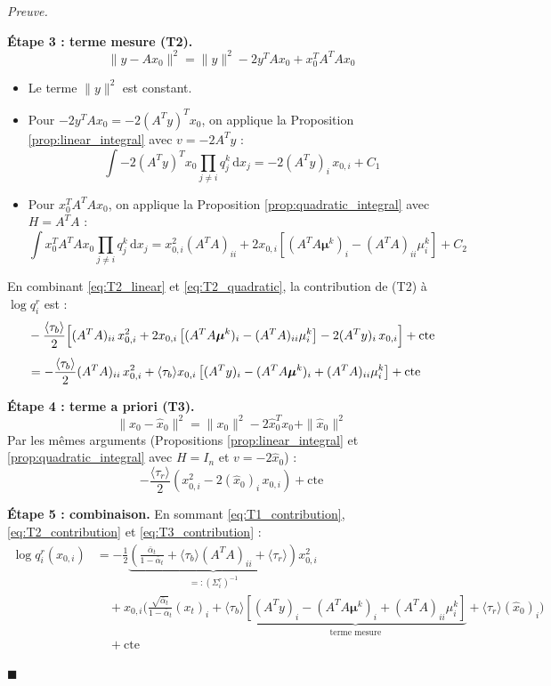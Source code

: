\documentclass[12pt]{article}
\newcommand{\alt}{\bar\alpha_t}
\renewcommand{\qedsymbol}{$\blacksquare$}
\renewenvironment{proof}[1][\proofname]{%
  \par\medskip\noindent
  \textit{\color{proofgray}#1.}\enspace\ignorespaces
}{\hfill\qedsymbol\par\medskip}
\renewcommand{\proofname}{Preuve}
\begin{document}
\begin{proof}
\textbf{Étape 3 : terme mesure (T2).}
\[
\|y - Ax_0\|^2 = \|y\|^2 - 2y^T A x_0 + x_0^T A^T A x_0
\]
\begin{itemize}
    \item Le terme $\|y\|^2$ est constant.
    \item Pour $-2y^T A x_0 = -2(A^T y)^T x_0$, on applique la Proposition \ref{prop:linear_integral} avec $v = -2A^T y$ :
    \begin{equation}
        \int -2(A^T y)^T x_0 \prod_{j \neq i} q_j^k\, \mathrm{d}x_j = -2(A^T y)_i\, x_{0,i} + C_1
        \label{eq:T2_linear}
    \end{equation}
    \item Pour $x_0^T A^T A x_0$, on applique la Proposition \ref{prop:quadratic_integral} avec $H = A^T A$ :
    \begin{equation}
        \int x_0^T A^T A x_0 \prod_{j \neq i} q_j^k\, \mathrm{d}x_j = x_{0,i}^2 (A^T A)_{ii} + 2x_{0,i}\left[(A^T A \boldsymbol{\mu}^k)_i - (A^T A)_{ii}\mu_i^k\right] + C_2
        \label{eq:T2_quadratic}
    \end{equation}
\end{itemize}

En combinant \eqref{eq:T2_linear} et \eqref{eq:T2_quadratic}, la contribution de (T2) à $\log q_i^r$ est :
\begin{align}
    &-\frac{\langle\tau_b\rangle}{2}\Bigl[(A^T A)_{ii}\, x_{0,i}^2 + 2x_{0,i}\left[(A^T A \boldsymbol{\mu}^k)_i - (A^T A)_{ii}\mu_i^k\right] - 2(A^T y)_i\, x_{0,i}\Bigr] + \mathrm{cte} \nonumber\\[4pt]
    &= -\frac{\langle\tau_b\rangle}{2}(A^T A)_{ii}\, x_{0,i}^2 + \langle\tau_b\rangle x_{0,i}\left[(A^T y)_i - (A^T A \boldsymbol{\mu}^k)_i + (A^T A)_{ii}\mu_i^k\right] + \mathrm{cte}
    \label{eq:T2_contribution}
\end{align}

\textbf{Étape 4 : terme a priori (T3).}
\[
\|x_0 - \hat{x}_0\|^2 = \|x_0\|^2 - 2\hat{x}_0^T x_0 + \|\hat{x}_0\|^2
\]
Par les mêmes arguments (Propositions \ref{prop:linear_integral} et \ref{prop:quadratic_integral} avec $H = I_n$ et $v = -2\hat{x}_0$) :
\begin{equation}
    -\frac{\langle\tau_r\rangle}{2}\left(x_{0,i}^2 - 2(\hat{x}_0)_i\, x_{0,i}\right) + \mathrm{cte}
    \label{eq:T3_contribution}
\end{equation}

\textbf{Étape 5 : combinaison.} En sommant \eqref{eq:T1_contribution}, \eqref{eq:T2_contribution} et \eqref{eq:T3_contribution} :
\begin{align}
    \log q_i^r(x_{0,i}) &= -\frac{1}{2}\underbrace{\left(\frac{\alt}{1-\alt} + \langle\tau_b\rangle (A^T A)_{ii} + \langle\tau_r\rangle\right)}_{=: (\Sigma_i^r)^{-1}} x_{0,i}^2 \nonumber\\[6pt]
    &\quad + x_{0,i} \Biggl(\frac{\sqrt{\alt}}{1-\alt}(x_t)_i + \langle\tau_b\rangle \underbrace{\left[(A^T y)_i - (A^T A \boldsymbol{\mu}^k)_i + (A^T A)_{ii}\mu_i^k\right]}_{\text{terme mesure}} + \langle\tau_r\rangle (\hat{x}_0)_i\Biggr) \nonumber\\[4pt]
    &\quad + \mathrm{cte}
    \label{eq:log_qr_combined}
\end{align}


\end{proof}
\end{document}
